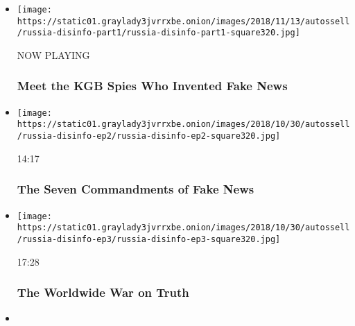 \begin{itemize}
\item
  \texttt{[image: https://static01.graylady3jvrrxbe.onion/images/2018/11/13/autossell/russia-disinfo-part1/russia-disinfo-part1-square320.jpg]}

  NOW PLAYING

  \hypertarget{meet-the-kgb-spies-who-invented-fake-news-2}{%
  \subsubsection{Meet the KGB Spies Who Invented Fake
  News}\label{meet-the-kgb-spies-who-invented-fake-news-2}}
\item
  \href{https://www.nytimes3xbfgragh.onion/video/opinion/100000006188102/what-is-pizzagate.html?action=click\&module=video-series-bar\&region=header\&pgtype=Article\&playlistId=video/opinion}{}

  \texttt{[image: https://static01.graylady3jvrrxbe.onion/images/2018/10/30/autossell/russia-disinfo-ep2/russia-disinfo-ep2-square320.jpg]}

  14:17

  \hypertarget{the-seven-commandments-of-fake-news}{%
  \subsubsection{The Seven Commandments of Fake
  News}\label{the-seven-commandments-of-fake-news}}
\item
  \href{https://www.nytimes3xbfgragh.onion/video/opinion/100000006188105/countering-disinformation-active-measures.html?action=click\&module=video-series-bar\&region=header\&pgtype=Article\&playlistId=video/opinion}{}

  \texttt{[image: https://static01.graylady3jvrrxbe.onion/images/2018/10/30/autossell/russia-disinfo-ep3/russia-disinfo-ep3-square320.jpg]}

  17:28

  \hypertarget{the-worldwide-war-on-truth}{%
  \subsubsection{The Worldwide War on
  Truth}\label{the-worldwide-war-on-truth}}
\item
  \href{https://www.nytimes3xbfgragh.onion/video/opinion/100000006831441/gods-from-space.html?action=click\&module=video-series-bar\&region=header\&pgtype=Article\&playlistId=video/opinion}{}


\end{itemize}

